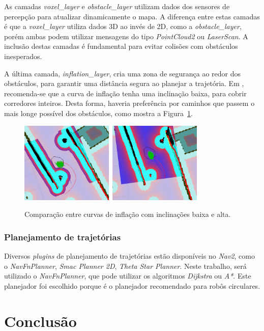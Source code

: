 \documentclass[repeatfields,xlists,xpacks,oneside,yearsonly]{ufrgscca}
\begin{document}
As camadas \textit{voxel\_layer} e \textit{obstacle\_layer} utilizam dados dos
sensores de percepção para atualizar dinamicamente o mapa.
A diferença entre estas camadas é que a \textit{voxel\_layer} utiliza dados 3D
ao invés de 2D, como a \textit{obstacle\_layer}, porém ambas podem utilizar mensagens
do tipo \textit{PointCloud2} ou \textit{LaserScan}.
A inclusão destas camadas é fundamental para evitar colisões com obstáculos
inesperados.

A última camada, \textit{inflation\_layer}, cria uma zona de segurança ao redor
dos obstáculos, para garantir uma distância segura ao planejar a trajetória.
Em \textcite{ros_tuning_guide}, recomenda-se que a curva de inflação tenha uma
inclinação baixa, para cobrir corredores inteiros.
Desta forma, haveria preferência por caminhos que passem o mais longe possível
dos obstáculos, como mostra a Figura~\ref{fig:inflation_layer}.

\begin{figure}[htbp]
    {
        \centering
        \caption{Comparação entre curvas de inflação com inclinações baixa e alta.}
        \label{fig:inflation_layer}
        \includegraphics[width=0.8\textwidth]{inflation_layer.png}\\
    }
    {}
\end{figure}

\subsection{Planejamento de trajetórias}

Diversos \textit{plugins} de planejamento de trajetórias estão disponíveis no \textit{Nav2},
como o \textit{NavFnPlanner}, \textit{Smac Planner 2D}, \textit{Theta Star Planner}.
Neste trabalho, será utilizado o \textit{NavFnPlanner}, que pode utilizar os algoritmos
\textit{Dijkstra} ou \textit{A*}.
Este planejador foi escolhido porque é o planejador recomendado para
robôs circulares.

\chapter{Conclusão}
\label{conclusao}
\end{document}
